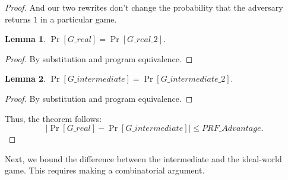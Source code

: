 \documentclass[12pt,lot, lof]{puthesis}
\newtheorem{lem}{Lemma}[thm]
\begin{document}
\begin{proof}
And our two rewrites don't change the probability that the adversary returns $1$ in a particular game.

\begin{lem} $\Pr[G\_real] = \Pr[G\_real\_2].$ \end{lem}
\begin{proof} By substitution and program equivalence. \end{proof}

\begin{lem}\label{intermediate2} $\Pr[G\_intermediate] = \Pr[G\_intermediate\_2].$ \end{lem}
\begin{proof} By substitution and program equivalence.  \end{proof}

Thus, the theorem follows:
$$|\Pr[G\_real] - \Pr[G\_intermediate]| \leq PRF\_Advantage.$$ \end{proof}

Next, we bound the difference between the intermediate and the ideal-world game. This requires making a combinatorial argument.
\end{document}
